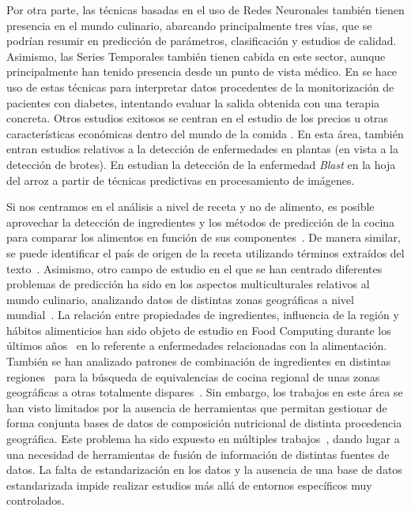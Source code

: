 Por otra parte, las técnicas basadas en el uso de Redes Neuronales también tienen presencia en el mundo culinario, abarcando principalmente tres vías, que se podrían resumir en predicción de parámetros, clasificación y estudios de calidad. Asimismo, las Series Temporales también tienen cabida en este sector, aunque principalmente han tenido presencia desde un punto de vista médico. En \cite{bellaci-biomedical} se hace uso de estas técnicas para interpretar datos procedentes de la monitorización de pacientes con diabetes, intentando evaluar la salida obtenida con una terapia concreta. Otros estudios exitosos se centran en el estudio de los precios u otras características económicas dentro del mundo de la comida \cite{Zou20072913}. En esta área, también entran estudios relativos a la detección de enfermedades en plantas (en vista a la detección de brotes). En \cite{towards-food-security-ia} estudian la detección de la enfermedad \textit{Blast} en la hoja del arroz a partir de técnicas predictivas en procesamiento de imágenes.

Si nos centramos en el análisis a nivel de receta y no de alimento, es posible aprovechar la detección de ingredientes y los métodos de predicción de la cocina para comparar los alimentos en función de sus componentes~\cite{Singh2015CSE2A}. De manera similar, se puede identificar el país de origen de la receta utilizando términos extraídos del texto~\cite{Min2018YouAreWhat}. Asimismo, otro campo de estudio en el que se han centrado diferentes problemas de predicción ha sido en los aspectos multiculturales relativos al mundo culinario, analizando datos de distintas zonas geográficas a nivel mundial~\cite{Sajadmanesh2019}. La relación entre propiedades de ingredientes, influencia de la región y hábitos alimenticios han sido objeto de estudio en Food Computing durante los últimos años~\cite{Min2018} en lo referente a enfermedades relacionadas con la alimentación. También se han analizado patrones de combinación de ingredientes en distintas regiones~\cite{Bossard2014} para la búsqueda de equivalencias de cocina regional de unas zonas geográficas a otras totalmente dispares~\cite{10.3389/fict.2018.00014}. Sin embargo, los trabajos en este área se han visto limitados por la ausencia de herramientas que permitan gestionar de forma conjunta bases de datos de composición nutricional de distinta procedencia geográfica. Este problema ha sido expuesto en múltiples trabajos~\cite{spanishStandariz}, dando lugar a una necesidad de herramientas de fusión de información de distintas fuentes de datos. La falta de estandarización en los datos y la ausencia de una base de datos estandarizada impide realizar estudios más allá de entornos específicos muy controlados.

